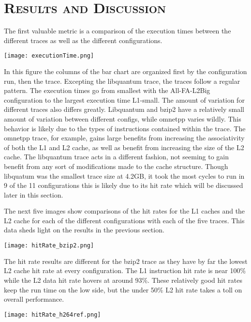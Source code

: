 \documentclass[cacheSimReport.tex]{subfiles}
\begin{document}
\section*{\textsc{\Large Results and Discussion}}

The first valuable metric is a comparison of the execution times between the different traces as well as the different configurations.

\smallskip

\hspace{-.9cm}\texttt{[image: executionTime.png]}

In this figure the columns of the bar chart are organized first by the configuration run, then the trace. Excepting the libquantum trace, the traces follow a regular pattern. The execution times go from smallest with the All-FA-L2Big configuration to the largest execution time L1-small. The amount of variation for different traces also differs greatly. Libquantum and bzip2 have a relatively small amount of variation between different configs, while omnetpp varies wildly. This behavior is likely due to the types of instructions contained within the trace. The omnetpp trace, for example, gains large benefits from increasing the associativity of both the L1 and L2 cache, as well as benefit from increasing the size of the L2 cache. The libquantum trace acts in a different fashion, not seeming to gain benefit from any sort of modifications made to the cache structure. Though libquatum was the smallest trace size at 4.2GB, it took the most cycles to run in 9 of the 11 configurations this is likely due to its hit rate which will be discussed later in this section.

\smallskip

The next five images show comparisons of the hit rates for the L1 caches and the L2 cache for each of the different configurations with each of the five traces. This data sheds light on the results in the previous section.

\hspace{-.9cm}\texttt{[image: hitRate\_bzip2.png]}

The hit rate results are different for the bzip2 trace as they have by far the lowest L2 cache hit rate at every configuration. The L1 instruction hit rate is near 100\% while the L2 data hit rate hovers at around 93\%. These relatively good hit rates keep the run time on the low side, but the under 50\% L2 hit rate takes a toll on overall performance.

\hspace{-.9cm}\texttt{[image: hitRate\_h264ref.png]}
\end{document}

